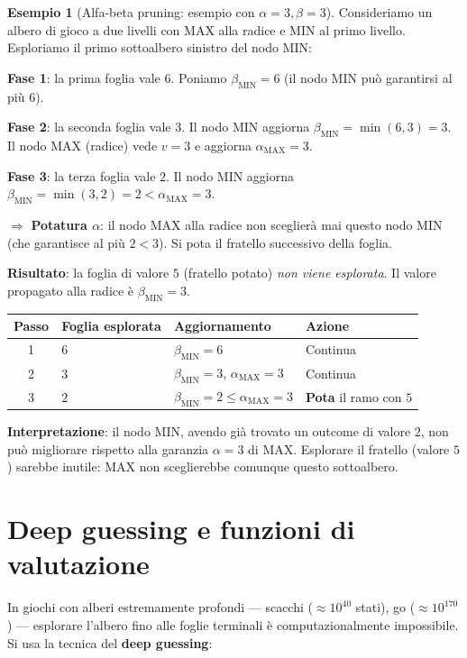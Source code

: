 \documentclass[12pt,a4paper,twoside]{book}
\theoremstyle{plain}
\theoremstyle{definition}
\newtheorem{example}[theorem]{Esempio}
\begin{document}
\begin{example}[Alfa-beta pruning: esempio con $\alpha=3, \beta=3$]
Consideriamo un albero di gioco a due livelli con MAX alla radice e MIN al primo livello. Esploriamo il primo sottoalbero sinistro del nodo MIN:

\textbf{Fase 1}: la prima foglia vale $6$. Poniamo $\beta_{\text{MIN}} = 6$ (il nodo MIN può garantirsi al più $6$).

\textbf{Fase 2}: la seconda foglia vale $3$. Il nodo MIN aggiorna $\beta_{\text{MIN}} = \min(6,3) = 3$. Il nodo MAX (radice) vede $v=3$ e aggiorna $\alpha_{\text{MAX}} = 3$.

\textbf{Fase 3}: la terza foglia vale $2$. Il nodo MIN aggiorna $\beta_{\text{MIN}} = \min(3,2) = 2 < \alpha_{\text{MAX}} = 3$.

$\Rightarrow$ \textbf{Potatura $\alpha$}: il nodo MAX alla radice non sceglierà mai questo nodo MIN (che garantisce al più $2 < 3$). Si pota il fratello successivo della foglia.

\textbf{Risultato}: la foglia di valore $5$ (fratello potato) \emph{non viene esplorata}. Il valore propagato alla radice è $\beta_{\text{MIN}} = 3$.

\begin{center}
\begin{tabular}{clll}
\toprule
Passo & Foglia esplorata & Aggiornamento & Azione \\
\midrule
1 & $6$ & $\beta_{\text{MIN}} = 6$ & Continua \\
2 & $3$ & $\beta_{\text{MIN}} = 3$, $\alpha_{\text{MAX}} = 3$ & Continua \\
3 & $2$ & $\beta_{\text{MIN}} = 2 \le \alpha_{\text{MAX}} = 3$ & \textbf{Pota} il ramo con $5$ \\
\bottomrule
\end{tabular}
\end{center}

\textbf{Interpretazione}: il nodo MIN, avendo già trovato un outcome di valore $2$, non può migliorare rispetto alla garanzia $\alpha=3$ di MAX. Esplorare il fratello (valore $5$) sarebbe inutile: MAX non sceglierebbe comunque questo sottoalbero.
\end{example}

\section{Deep guessing e funzioni di valutazione}

In giochi con alberi estremamente profondi — scacchi ($\approx 10^{40}$ stati), go ($\approx 10^{170}$) — esplorare l'albero fino alle foglie terminali è computazionalmente impossibile. Si usa la tecnica del \textbf{deep guessing}:
\end{document}
